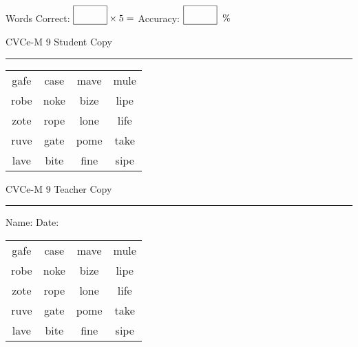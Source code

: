 \documentclass{memoir}
\begin{document}
\small

Words Correct: $\fbox{\phantom{\huge 100}} \times 5 = $ Accuracy: $\fbox{\phantom{\huge 100}}\;\; \%$ 

\vfill

\newpage


\footnotesize \noindent
CVCe-M 9 \hfill Student Copy
\smallskip
\hrule

\Large

\setlength{\tabcolsep}{14pt}
\def\arraystretch{2}

{\selectfont


\begin{vplace}[0.5]
\begin{center}
\begin{tabular}{cccc}
gafe & case & mave & mule \\
robe & noke & bize & lipe \\
zote & rope & lone & life \\
ruve & gate & pome & take \\
lave & bite & fine & sipe \\
\end{tabular}
\end{center}
\end{vplace}

}

\newpage

\footnotesize \noindent
CVCe-M 9 \hfill Teacher Copy
\smallskip
\hrule

\small

\vfill

\noindent
Name: \underline{\hspace{1.75in}} \hfill Date: \underline{\hspace{1in}}

\Large

{\selectfont


\begin{vplace}[0.5]
\begin{center}
\begin{tabular}{cccc}
gafe & case & mave & mule \\
robe & noke & bize & lipe \\
zote & rope & lone & life \\
ruve & gate & pome & take \\
lave & bite & fine & sipe \\
\end{tabular}
\end{center}
\end{vplace}



}
\end{document}
